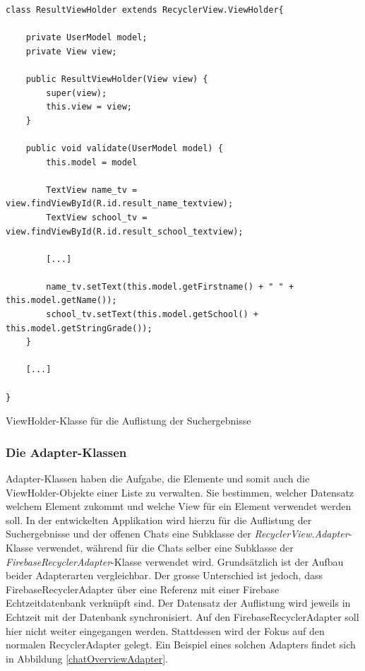 \documentclass[../main.tex]{subfiles}
\begin{document}
\begin{code}
	\begin{center}
		\begin{verbatim}
class ResultViewHolder extends RecyclerView.ViewHolder{
	
	private UserModel model;
	private View view;
	
	public ResultViewHolder(View view) {
		super(view);
		this.view = view;
	}
	
	public void validate(UserModel model) {
		this.model = model
	
		TextView name_tv = view.findViewById(R.id.result_name_textview);
		TextView school_tv = view.findViewById(R.id.result_school_textview);
		
		[...]
		
		name_tv.setText(this.model.getFirstname() + " " + this.model.getName());
		school_tv.setText(this.model.getSchool() + this.model.getStringGrade());
	}
	
	[...]
	
}
		\end{verbatim}
		\caption{ViewHolder-Klasse für die Auflistung der Suchergebnisse}
		\label{viewHolder}
	\end{center}
\end{code}

	
	\subsubsection{Die Adapter-Klassen}
	Adapter-Klassen haben die Aufgabe, die Elemente und somit auch die ViewHolder-Objekte einer Liste zu verwalten. Sie bestimmen, welcher Datensatz welchem Element zukommt und welche View für ein Element verwendet werden soll. In der entwickelten Applikation wird hierzu für die Auflistung der Suchergebnisse und der offenen Chats eine Subklasse der \emph{RecyclerView.Adapter}-Klasse verwendet, während für die Chats selber eine Subklasse der \emph{FirebaseRecyclerAdapter}-Klasse verwendet wird. Grundsätzlich ist der Aufbau beider Adapterarten vergleichbar. Der grosse Unterschied ist jedoch, dass FirebaseRecyclerAdapter über eine Referenz mit einer Firebase Echtzeitdatenbank verknüpft sind. Der Datensatz der Auflistung wird jeweils in Echtzeit mit der Datenbank synchronisiert. Auf den FirebaseRecyclerAdapter soll hier nicht weiter eingegangen werden. Stattdessen wird der Fokus auf den normalen RecyclerAdapter gelegt. Ein Beispiel eines solchen Adapters findet sich in Abbildung \ref{chatOverviewAdapter}.
	
\end{document}
